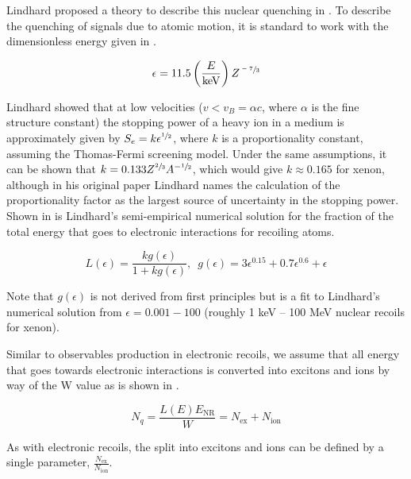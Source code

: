 Lindhard proposed a theory to describe this nuclear quenching in .  To describe the quenching of signals due to atomic motion, it is standard to work with the dimensionless energy given in .

\begin{equation}
        \label{eqn:dimensionless_energy}
        \epsilon = 11.5 \left( \frac{E}{\textrm{keV}} \right) Z^{\sfrac{-7}{3}}
\end{equation}

Lindhard showed that at low velocities ($v < v_B = \alpha c$, where $\alpha$ is the fine structure constant) the stopping power of a heavy ion in a medium is approximately given by $S_e = k \epsilon^{\sfrac{1}{2}}$, where $k$ is a proportionality constant, assuming the Thomas-Fermi screening model.  Under the same assumptions, it can be shown that $k = 0.133 Z^{\sfrac{2}{3}} A^{-\sfrac{1}{2}}$, which would give $k \approx 0.165$ for xenon, although in his original paper Lindhard names the calculation of the proportionality factor as the largest source of uncertainty in the stopping power.  Shown in  is Lindhard's semi-empirical numerical solution for the fraction of the total energy that goes to electronic interactions for recoiling atoms.

\begin{equation}
        \label{eqn:lindhard_electronic}
        L(\epsilon) = \frac{k g(\epsilon)}{1 + k g(\epsilon)}, \, \, \, g(\epsilon) = 3 \epsilon^{0.15} + 0.7 \epsilon^{0.6} + \epsilon
\end{equation}

Note that $g(\epsilon)$ is not derived from first principles but is a fit to Lindhard's numerical solution from $\epsilon = 0.001 - 100$ (roughly 1 keV -- 100 MeV nuclear recoils for xenon).

Similar to observables production in electronic recoils, we assume that all energy that goes towards electronic interactions is converted into excitons and ions by way of the W value as is shown in .

\begin{equation}
        \label{eqn:quanta_nr}
        N_q = \frac{L(E) E_{\textrm{NR}}}{W} = N_{\textrm{ex}} + N_{\textrm{ion}}
\end{equation}

As with electronic recoils, the split into excitons and ions can be defined by a single parameter, $\frac{N_{\textrm{ex}}}{N_{\textrm{ion}}}$.

